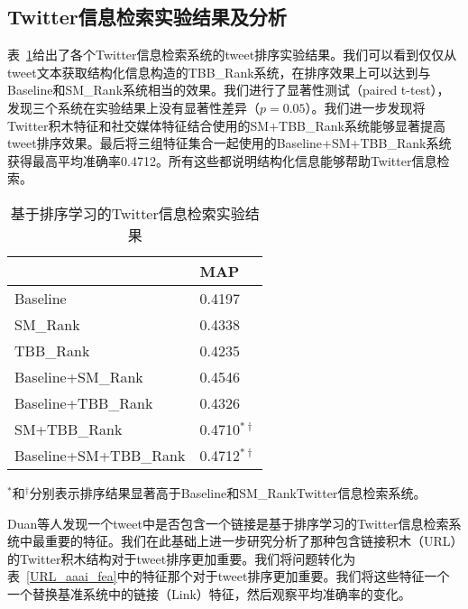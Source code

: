  \subsection{Twitter信息检索实验结果及分析}
 
表~\ref{Res_aaai_TBB}给出了各个Twitter信息检索系统的tweet排序实验结果。我们可以看到仅仅从tweet文本获取结构化信息构造的TBB\_Rank系统，在排序效果上可以达到与Baseline和SM\_Rank系统相当的效果。我们进行了显著性测试（paired t-test），发现三个系统在实验结果上没有显著性差异（$p=0.05$）。我们进一步发现将Twitter积木特征和社交媒体特征结合使用的SM+TBB\_Rank系统能够显著提高tweet排序效果。最后将三组特征集合一起使用的Baseline+SM+TBB\_Rank系统获得最高平均准确率0.4712。所有这些都说明结构化信息能够帮助Twitter信息检索。

\begin{table}[htp]
 \centering
 \caption{基于排序学习的Twitter信息检索实验结果}
  \label{Res_aaai_TBB}
 \begin{tabular}{|l | l|}
 \hline
 & \textbf{MAP} \\
 \hline
 Baseline & 0.4197 \\
 SM\_Rank & 0.4338 \\
 TBB\_Rank & 0.4235 \\
 Baseline+SM\_Rank & 0.4546 \\
 Baseline+TBB\_Rank & 0.4326 \\
 SM+TBB\_Rank & 0.4710$^{\ast\dagger}$\\
 Baseline+SM+TBB\_Rank & 0.4712$^{\ast\dagger}$\\
 \hline
 \end{tabular}
  \begin{tablenotes}
        \footnotesize
\item $^{\ast}$和$^{\dagger}$分别表示排序结果显著高于Baseline和SM\_RankTwitter信息检索系统。
\end{tablenotes}
\end{table}

Duan等人发现一个tweet中是否包含一个链接是基于排序学习的Twitter信息检索系统中最重要的特征。我们在此基础上进一步研究分析了那种包含链接积木（URL）的Twitter积木结构对于tweet排序更加重要。我们将问题转化为表~\ref{URL_aaai_fea}中的特征那个对于tweet排序更加重要。我们将这些特征一个一个替换基准系统中的链接（Link）特征，然后观察平均准确率的变化。

